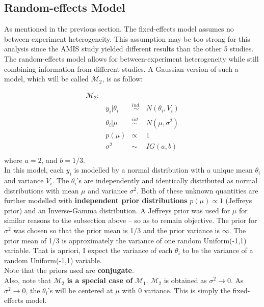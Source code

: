 \documentclass{../../tex_template/asaproc}
\newcommand{\M}{\mathcal{M}}
\newcommand{\simi}{\overset{ind.}{\sim}}
\newcommand{\iid}{\overset{iid}{\sim}}
\begin{document}
\subsection{Random-effects Model}
As mentioned in the previous section. The fixed-effects model assumes no
between-experiment heterogeneity. This assumption may be too strong for this
analysis since the AMIS study yielded different results than the other 5
studies. The random-effects model allows for between-experiment heterogeneity
while still combining information from different studies. A Gaussian version
of such a model, which will be called $\M_2$, is as follow:

$$
\begin{array}{lrcl}
  \M_2: \\
  & y_i | \theta_i &\simi& N(\theta_i,V_i)\\
  & \theta_i | \mu &\iid& N(\mu,\sigma^2)\\
  & p(\mu) &\propto& 1\\
  & \sigma^2 &\sim& IG(a,b)\\
\end{array}
$$
where $a = 2$, and $b = 1/3$.\\

In this model, each $y_i$ is modelled by a normal distribution with a unique
mean $\theta_i$ and variance $V_i$. The $\theta_i$'s are independently and
identically distributed as normal distributions with mean $\mu$ and variance
$\sigma^2$. Both of these unknown quantities are further modelled with
\textbf{independent prior distributions} $p(\mu)\propto 1$ (Jeffreys prior) and
an Inverse-Gamma distribution. A Jeffreys prior was used for $\mu$ for similar
reasons to the subsection above -- so as to remain objective. The prior for
$\sigma^2$ was chosen so that the prior mean is 1/3 and the prior variance is
$\infty$. The prior mean of 1/3 is approximately the variance of one random
Uniform(-1,1) variable. That is apriori, I expect the variance of each
$\theta_i$ to be the variance of a random Uniform(-1,1) variable. \\

Note that the priors used are \textbf{conjugate}.\\

Also, note that $\M_2$ \textbf{is a special case of} $\M_1$. $\M_2$ is
obtained as $\sigma^2 \rightarrow 0$. As $\sigma^2 \rightarrow 0$, 
the $\theta_i$'s will be centered at $\mu$ with 0 variance. This
is simply the fixed-effects model.\\
\end{document}
